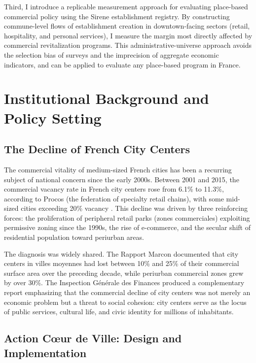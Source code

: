 \documentclass[12pt]{article}
\begin{document}
Third, I introduce a replicable measurement approach for evaluating place-based commercial policy using the Sirene establishment registry. By constructing commune-level flows of establishment creation in downtown-facing sectors (retail, hospitality, and personal services), I measure the margin most directly affected by commercial revitalization programs. This administrative-universe approach avoids the selection bias of surveys and the imprecision of aggregate economic indicators, and can be applied to evaluate any place-based program in France.


\section{Institutional Background and Policy Setting}
\label{sec:background}

\subsection{The Decline of French City Centers}

The commercial vitality of medium-sized French cities has been a recurring subject of national concern since the early 2000s. Between 2001 and 2015, the commercial vacancy rate in French city centers rose from 6.1\% to 11.3\%, according to Procos (the federation of specialty retail chains), with some mid-sized cities exceeding 20\% vacancy \citep{procos2018}. This decline was driven by three reinforcing forces: the proliferation of peripheral retail parks (zones commerciales) exploiting permissive zoning since the 1990s, the rise of e-commerce, and the secular shift of residential population toward periurban areas.

The diagnosis was widely shared. The Rapport Marcon \citeyearpar{marcon2017} documented that city centers in villes moyennes had lost between 10\% and 25\% of their commercial surface area over the preceding decade, while periurban commercial zones grew by over 30\%. The Inspection G\'en\'erale des Finances produced a complementary report emphasizing that the commercial decline of city centers was not merely an economic problem but a threat to social cohesion: city centers serve as the locus of public services, cultural life, and civic identity for millions of inhabitants.

\subsection{Action C\oe ur de Ville: Design and Implementation}
\end{document}
